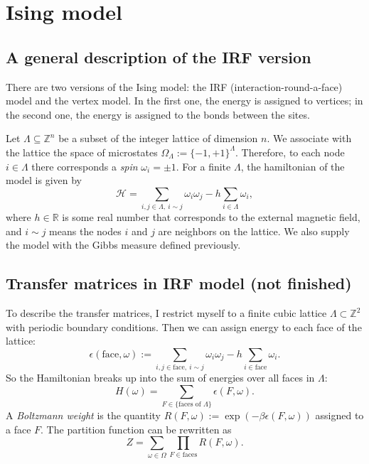 \section{Ising model}
\subsection{A general description of the IRF version}
There are two versions of the Ising model: the IRF (interaction-round-a-face) model and the vertex model. In the first one, the energy is assigned to vertices; in the second one, the energy is assigned to the bonds between the sites. 

Let $\Lambda \subseteq \mathbb Z^n$ be a subset of the integer lattice of dimension $n$. We associate with the lattice the space of microstates $\Omega_{\Lambda} := \{-1,+1\}^{\Lambda}$. Therefore, to each node $i \in \Lambda$ there corresponds a \emph{spin} $\omega_i = \pm 1$. For a finite $\Lambda$, the hamiltonian of the model is given by
\[
\mathcal H = \sum_{i,j \in \Lambda, \ i \sim j} \omega_i \omega_j - h \sum_{i \in \Lambda} \omega_i,
\]
where $h \in \mathbb R$ is some real number that corresponds to the external magnetic field, and $i \sim j$ means the nodes $i$ and $j$ are neighbors on the lattice. We also supply the model with the Gibbs measure defined previously.

\subsection{Transfer matrices in IRF model (not finished)}
To describe the transfer matrices, I restrict myself to a finite cubic lattice $\Lambda\subset \mathbb Z^2$ with periodic boundary conditions. Then we can assign energy to each face of the lattice:
\[
\epsilon(\text{face},\omega) := \sum_{i,j \in \text{face}, \ i \sim j} \omega_i \omega_j - h \sum_{i \in \text{face}} \omega_i.
\]
So the Hamiltonian breaks up into the sum of energies over all faces in $\Lambda$: 
\[
H(\omega) = \sum_{F \in \{\text{faces of }\Lambda\}} \epsilon(F,\omega).
\]
A \emph{Boltzmann weight} is the quantity $R(F,\omega):=\exp(-\beta \epsilon(F,\omega))$ assigned to a face $F$. The partition function can be rewritten as
\[
Z = \sum_{\omega \in \Omega}\prod_{F \in \text{faces}} R(F,\omega).
\]


